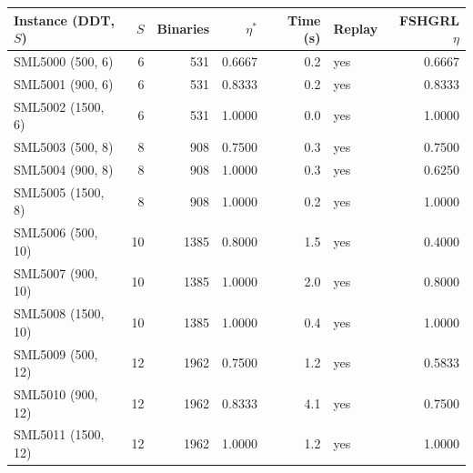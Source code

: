 \begin{tabular}{lrrrrlr}
\toprule
Instance (DDT, $S$) & $S$ & Binaries & $\eta^*$ & Time (s) & Replay & FSHGRL $\eta$ \\
\midrule
SML5000 (500, 6) & 6 & 531 & 0.6667 & 0.2 & yes & 0.6667 \\
SML5001 (900, 6) & 6 & 531 & 0.8333 & 0.2 & yes & 0.8333 \\
SML5002 (1500, 6) & 6 & 531 & 1.0000 & 0.0 & yes & 1.0000 \\
SML5003 (500, 8) & 8 & 908 & 0.7500 & 0.3 & yes & 0.7500 \\
SML5004 (900, 8) & 8 & 908 & 1.0000 & 0.3 & yes & 0.6250 \\
SML5005 (1500, 8) & 8 & 908 & 1.0000 & 0.2 & yes & 1.0000 \\
SML5006 (500, 10) & 10 & 1385 & 0.8000 & 1.5 & yes & 0.4000 \\
SML5007 (900, 10) & 10 & 1385 & 1.0000 & 2.0 & yes & 0.8000 \\
SML5008 (1500, 10) & 10 & 1385 & 1.0000 & 0.4 & yes & 1.0000 \\
SML5009 (500, 12) & 12 & 1962 & 0.7500 & 1.2 & yes & 0.5833 \\
SML5010 (900, 12) & 12 & 1962 & 0.8333 & 4.1 & yes & 0.7500 \\
SML5011 (1500, 12) & 12 & 1962 & 1.0000 & 1.2 & yes & 1.0000 \\
\bottomrule
\end{tabular}
